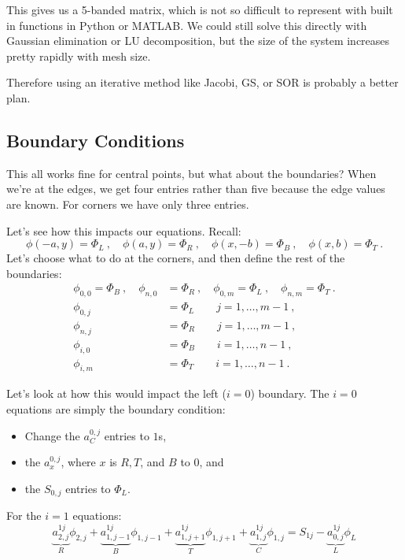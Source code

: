 \documentclass[12pt, answers]{exam}
\begin{document}
This gives us a 5-banded matrix, which is not so difficult to represent with built in functions in Python or MATLAB. We could still solve this directly with Gaussian elimination or LU decomposition, but the size of the system increases pretty rapidly with mesh size.

Therefore using an iterative method like Jacobi, GS, or SOR is probably a better plan. 


\subsection*{Boundary Conditions}

This all works fine for central points, but what about the boundaries? When we're at the edges, we get four entries rather than five because the edge values are known. For corners we have only three entries. 

Let's see how this impacts our equations. Recall:
%
\[\phi(-a,y) = \Phi_L\:, \quad \phi(a,y) = \Phi_R\:, \quad \phi(x,-b) = \Phi_B\:, \quad \phi(x,b) = \Phi_T\:.\]
%
Let's choose what to do at the corners, and then define the rest of the boundaries:
%
\begin{align}
\phi_{0,0} = \Phi_B\:, \quad \phi_{n,0} &= \Phi_R\:, \quad \phi_{0,m} = \Phi_L\:, \quad \phi_{n,m} = \Phi_T\:. \nonumber \\
\phi_{0,j} &= \Phi_L \qquad j=1,\dots,m-1 \:, \nonumber \\
\phi_{n,j} &= \Phi_R \qquad j=1,\dots,m-1 \:, \nonumber \\
\phi_{i,0} &= \Phi_B \qquad i=1,\dots,n-1 \:, \nonumber \\
\phi_{i,m} &= \Phi_T \qquad i=1,\dots,n-1 \:. \nonumber 
\end{align}

Let's look at how this would impact the left ($i=0$) boundary. The $i=0$ equations are simply the boundary condition:
\begin{itemize}
\item Change the $a_{C}^{0,j}$ entries to $1$s, 
\item the $a_{x}^{0,j}$, where $x$ is $R, T$, and $B$ to $0$, and 
\item the $S_{0,j}$ entries to $\Phi_L$.
\end{itemize} 

For the $i=1$ equations:
\[\underbrace{a_{2,j}^{1j}}_{R}\phi_{2,j} + \underbrace{a_{1,j-1}^{1j}}_{B}\phi_{1,j-1} + \underbrace{a_{1,j+1}^{1j}}_{T}\phi_{1,j+1} + \underbrace{a_{1,j}^{1j}}_{C}\phi_{1,j} = S_{1j} - \underbrace{a_{0,j}^{1j}}_{L}\phi_L \]
\end{document}
